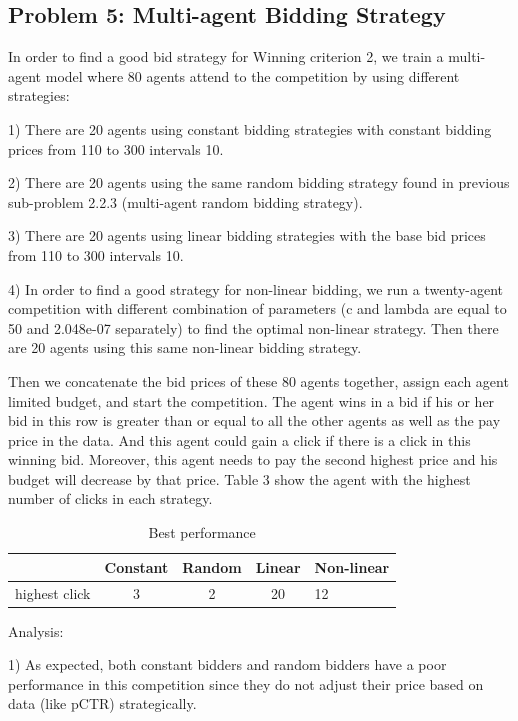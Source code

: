 \documentclass{sig-alternate-05-2015}
\begin{document}
\subsection{Problem 5: Multi-agent Bidding Strategy}

In order to find a good bid strategy for Winning criterion 2, we train a multi-agent model where 80 agents attend to the competition by using different strategies:

1)	There are 20 agents using constant bidding strategies with constant bidding prices from 110 to 300 intervals 10.

2)	There are 20 agents using the same random bidding strategy found in previous sub-problem 2.2.3 (multi-agent random bidding strategy).

3)	There are 20 agents using linear bidding strategies with the base bid prices from 110 to 300 intervals 10.

4)	In order to find a good strategy for non-linear bidding, we run a twenty-agent competition with different combination of parameters (c and lambda are equal to 50 and 2.048e-07 separately) to find the optimal non-linear strategy. Then there are 20 agents using this same non-linear bidding strategy.

Then we concatenate the bid prices of these 80 agents together, assign each agent limited budget, and start the competition. The agent wins in a bid if his or her bid in this row is greater than or equal to all the other agents as well as the pay price in the data. And this agent could gain a click if there is a click in this winning bid. Moreover, this agent needs to pay the second highest price and his budget will decrease by that price. Table 3 show the agent with the highest number of clicks in each strategy.

\begin{table}
\centering
\caption{Best performance}
\begin{tabular}{|c|c|c|c|l|} \hline
&Constant &Random &Linear&Non-linear\\ \hline
highest click&3&2&20&12\\
\hline\end{tabular}
\end{table}

Analysis:

1) As expected, both constant bidders and random bidders have a poor performance in this competition since they do not adjust their price based on data (like pCTR) strategically.
\end{document}
